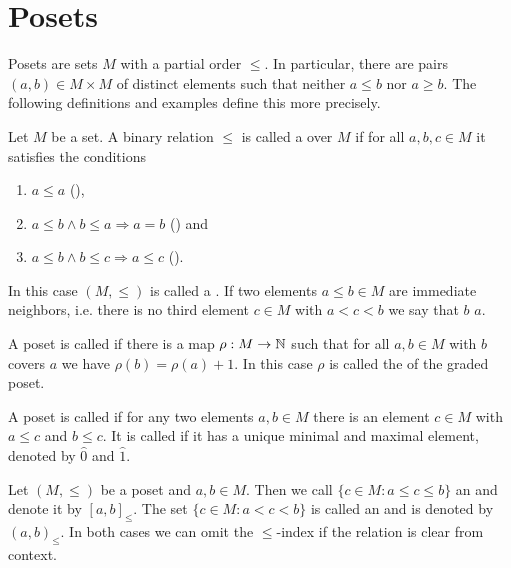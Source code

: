 \section{Posets}
\label{sec:posets}

Posets are sets $M$ with a partial order $\leq$. In particular, there are pairs $(a,b) \in M \times M$ of distinct elements such that neither $a \leq b$ nor $a \geq b$. The following definitions and examples define this more precisely.

\begin{defi}
	Let $M$ be a set. A binary relation $\leq$ is called a  over $M$ if for all $a,b,c \in M$ it satisfies the conditions
	\begin{enumerate}
		\item $a \leq a$ (),
		\item $a \leq b \wedge b \leq a \Rightarrow a=b$ () and
		\item $a \leq b \wedge b \leq c \Rightarrow a \leq c$ ().
	\end{enumerate}
	In this case $(M,\leq)$ is called a . If two elements $a \leq b \in M$ are immediate neighbors, i.e. there is no third element $c \in M$ with $a < c < b$ we say that $b$  $a$.
\end{defi}

\begin{defi}
	A poset is called  if there is a map $\rho : M \to \mathbb{N}$ such that for all $a,b \in M$ with $b$ covers $a$ we have $\rho(b) = \rho(a) + 1$. In this case $\rho$ is called the  of the graded poset.
\end{defi}

\begin{defi}
	A poset is called  if for any two elements $a,b \in M$ there is an element $c \in M$ with $a \leq c$ and $b \leq c$. It is called  if it has a unique minimal and maximal element, denoted by $\hat 0$ and $\hat 1$.
\end{defi}

\begin{defi}
	Let $(M,\leq)$ be a poset and $a,b \in M$. Then we call $\{ c \in M : a \leq c \leq b \}$ an  and denote it by $[a,b]_\leq$. The set $\{ c \in M : a < c < b \}$ is called an  and is denoted by $(a,b)_\leq$. In both cases we can omit the $\leq$-index if the relation is clear from context.
\end{defi}

